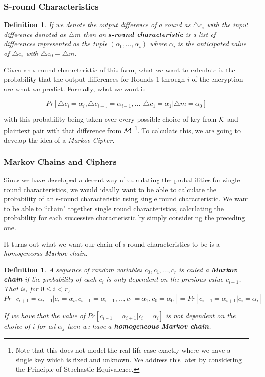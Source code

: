\documentclass[12pt,a4paper]{article}
\newtheorem{definition}[theorem]{Definition}
\begin{document}
\subsubsection{S-round Characteristics}

\begin{definition}
If we denote the output difference of a round
as $\triangle c_i$ with the input difference denoted as $\triangle m$ then 
an \textbf{s-round characteristic} is a list of differences represented as the tuple
$(\alpha_0, \ldots, \alpha_s)$ where $\alpha_i$ is the anticipated value of
$\triangle c_i$ with $\triangle c_0 = \triangle m$.
\end{definition}

Given an s-round characteristic of this form, what we want to calculate is the
probability that the output differences for Rounds 1 through $i$ of the
encryption are what we predict. Formally, what we want is

\[Pr[\triangle c_i = \alpha_i, \triangle c_{i-1} = \alpha_{i-1},
\ldots,\triangle c_1 = \alpha_1 | \triangle m = \alpha_0]\]

with this probability being taken over every possible choice of key from
$\cal{K}$ and plaintext pair with that difference from $\cal{M}$
\footnote{Note that this does not model the real life case exactly where we have
a single key which is fixed and unknown. We address this later by considering
the Principle of Stochastic Equivalence.}. To calculate this, we are going to
develop the idea of a \textit{Markov Cipher}.

\subsubsection{Markov Chains and Ciphers}
\label{sec:Markov}
Since we have developed a decent way of calculating the probabilities for single
round characteristics, we would ideally want to be able to calculate the
probability of an s-round characteristic using single round
characteristic. We want to be able to ``chain" together
single round characteristics, calculating the probability for each successive
characteristic by simply considering the preceding one. 

It turns out what we want our chain of s-round characteristics to be is a
\textit{homogeneous Markov chain}.

\begin{definition}
A sequence of random variables $c_0,c_1,\ldots,c_r$ is called a \textbf{Markov
chain} if the probability of each $c_i$ is only dependent on the previous value
$c_{i-1}$. That is, for $0 \leq i < r$,
\[Pr[c_{i+1} = \alpha_{i+1} | c_i = \alpha_i, c_{i-1}
= \alpha_{i-1}, \ldots, c_1 = \alpha_1, c_0 = \alpha_0] = Pr[c_{i+1} =
\alpha_{i+1} | c_i = \alpha_i]\]

If we have that the value of $Pr[c_{i+1} = \alpha_{i+1} | c_i = \alpha_i]$ is
not dependent on the choice of $i$ for all $\alpha_j$ then we have a \textbf{homogeneous
Markov chain}.
\end{definition}
\end{document}
